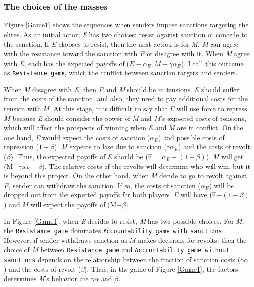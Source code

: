 \documentclass[11pt, letterpage]{article}
\begin{document}
\begin{center}
	
\end{center}

\subsubsection*{The choices of the masses}

Figure \ref{Game1} shows the sequences when senders impose sanctions targeting the elites. As an initial actor, \textit{E} has two choices: resist against sanction or concede to the sanction. If \textit{E} chooses to resist, then the next action is for \textit{M}. \textit{M} can agree with the resistance toward the sanction with \textit{E} or disagree with it. When \textit{M} agree with \textit{E}, each has the expected payoffs of ($E - \alpha_E, M - \gamma\alpha_{E}$). I call this outcome as \texttt{Resistance game}, which the conflict between sanction targets and senders.
	
When \textit{M} disagree with \textit{E}, then \textit{E} and \textit{M} should be in tensions. \textit{E} should suffer from the costs of the sanction, and also, they need to pay additional costs for the tension with \textit{M}. At this stage, it is difficult to say that \textit{E} will use force to repress \textit{M} because \textit{E} should consider the power of \textit{M} and \textit{M}'s expected costs of tensions, which will affect the prospects of winning when \textit{E} and \textit{M} are in conflict. On the one hand, \textit{E} would expect the costs of sanction ($\alpha_{E}$) and possible costs of repression ($1-\beta$). \textit{M} expects to lose due to sanction ($\gamma\alpha_{E}$) and the costs of revolt ($\beta$). Thus, the expected payoffs of \textit{E} should be (E$=\alpha_{E}-(1-\beta)$). \textit{M} will get (M$-\gamma\alpha_{E}-\beta$). The relative costs of the revolts will determine who will win, but it is beyond this project. On the other hand, when \textit{M} decide to go to revolt against \textit{E}, sender can withdraw the sanction. If so, the costs of sanction ($\alpha_{E}$) will be dropped out from the expected payoffs for both players. \textit{E} will have (E$-(1-\beta)$) and \textit{M} will expect the payoffs of (M$-\beta$).

In Figure \ref{Game1}, when \textit{E} decides to resist, \textit{M} has two possible choices. For \textit{M}, the \texttt{Resistance game} dominates \texttt{Accountability game with sanctions}. However, if sender withdraws sanction as \textit{M} makes decisions for revolts, then the choice of \textit{M} between \texttt{Resistance game} and \texttt{Accountability game without sanctions} depends on the relationship between the fraction of sanction costs ($\gamma\alpha$)  and the costs of revolt ($\beta$). Thus, in the game of Figure \ref{Game1}, the factors determines \textit{M}'s behavior are $\gamma\alpha$ and $\beta$.
\end{document}
